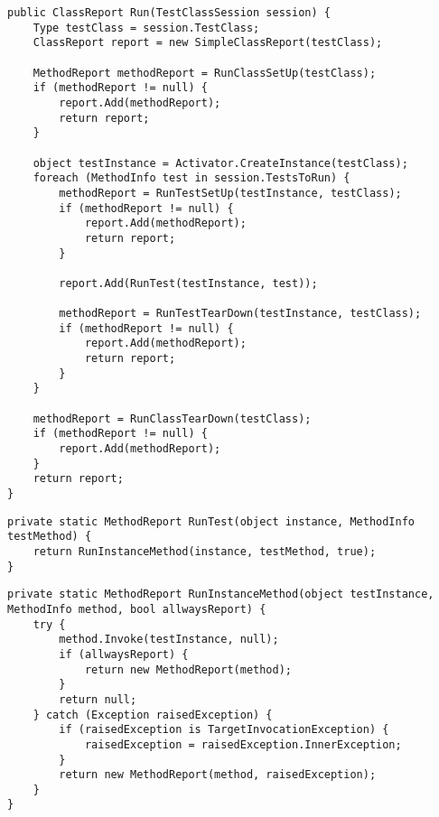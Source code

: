 \begin{lstlisting}[caption={[Quellcode der \textit{Run}-Methode von \textit{SimpleTestRunner}]Quellcode der \textit{Run}-Methode von \textit{SimpleTestRunner}}, label=code:SimpleTestRunner_Run]
public ClassReport Run(TestClassSession session) {
    Type testClass = session.TestClass;
    ClassReport report = new SimpleClassReport(testClass);

    MethodReport methodReport = RunClassSetUp(testClass);
    if (methodReport != null) {
        report.Add(methodReport);
        return report;
    }

    object testInstance = Activator.CreateInstance(testClass);
    foreach (MethodInfo test in session.TestsToRun) {
        methodReport = RunTestSetUp(testInstance, testClass);
        if (methodReport != null) {
            report.Add(methodReport);
            return report;
        }

        report.Add(RunTest(testInstance, test));

        methodReport = RunTestTearDown(testInstance, testClass);
        if (methodReport != null) {
            report.Add(methodReport);
            return report;
        }
    }

    methodReport = RunClassTearDown(testClass);
    if (methodReport != null) {
        report.Add(methodReport);
    }
    return report;
}
\end{lstlisting}

\begin{lstlisting}[caption={[Quellcode der \textit{RunTest}-Methode von \textit{SimpleTestRunner}]Quellcode der \textit{RunTest}-Methode von \textit{SimpleTestRunner}}, label=code:SimpleTestRunner_RunTest]
private static MethodReport RunTest(object instance, MethodInfo testMethod) {
    return RunInstanceMethod(instance, testMethod, true);
}
\end{lstlisting}

\begin{lstlisting}[caption={[Quellcode der \textit{RunInstanceMethod}-Methode von \textit{SimpleTestRunner}]Quellcode der \textit{\textbf{RunTest}}-Methode von \textit{SimpleTestRunner}}, label=code:SimpleTestRunner_RunInstanceMethod]
private static MethodReport RunInstanceMethod(object testInstance, MethodInfo method, bool allwaysReport) {
    try {
        method.Invoke(testInstance, null);
        if (allwaysReport) {
            return new MethodReport(method);
        }
        return null;
    } catch (Exception raisedException) {
        if (raisedException is TargetInvocationException) {
            raisedException = raisedException.InnerException;
        }
        return new MethodReport(method, raisedException);
    }
}
\end{lstlisting}